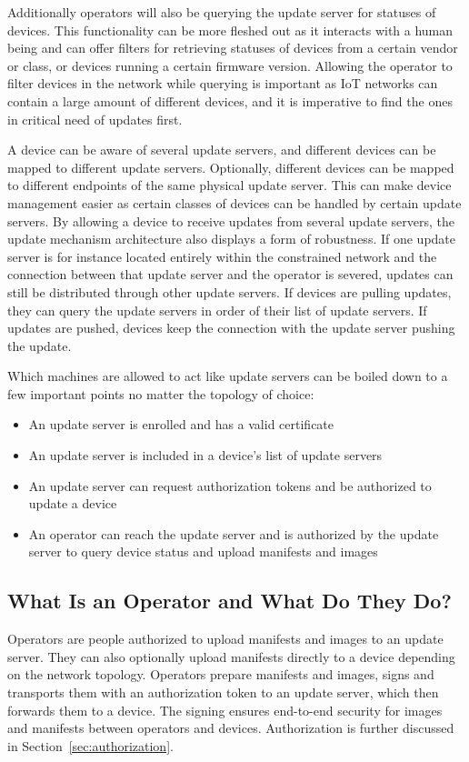 \documentclass[0-thesis.tex]{subfiles}
\begin{document}
Additionally operators will also be querying the update server for statuses of devices.
This functionality can be more fleshed out as it interacts with a human being and can
offer filters for retrieving statuses of devices from a certain vendor or class, or
devices running a certain firmware version. Allowing the operator to filter devices in the
network while querying is important as IoT networks can contain a large amount of
different devices, and it is imperative to find the ones in critical need of updates
first.

A device can be aware of several update servers, and different devices can be mapped to
different update servers. Optionally, different devices can be mapped to different
endpoints of the same physical update server. This can make device management easier as
certain classes of devices can be handled by certain update servers. By allowing a device
to receive updates from several update servers, the update mechanism architecture also
displays a form of robustness. If one update server is for instance located entirely
within the constrained network and the connection between that update server and the
operator is severed, updates can still be distributed through other update servers. If
devices are pulling updates, they can query the update servers in order of their list of
update servers. If updates are pushed, devices keep the connection with the update server
pushing the update.

Which machines are allowed to act like update servers can be boiled down to a few
important points no matter the topology of choice:

\begin{itemize}
    \item An update server is enrolled and has a valid certificate
    \item An update server is included in a device's list of update servers
    \item An update server can request authorization tokens and be authorized to update a
            device
    \item An operator can reach the update server and is authorized by the update server
            to query device status and upload manifests and images
\end{itemize}

\subsection{What Is an Operator and What Do They Do?}
\label{ssec:what-is-an-operator}
Operators are people authorized to upload manifests and images to an update server. They
can also optionally upload manifests directly to a device depending on the network
topology. Operators prepare manifests and images, signs and transports them with an
authorization token to an update server, which then forwards them to a device. The signing
ensures end-to-end security for images and manifests between operators and devices.
Authorization is further discussed in Section~\ref{sec:authorization}.
\end{document}
